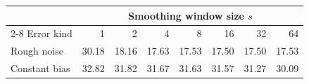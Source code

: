 \begin{tabular}{lrrrrrrr}
\toprule
& \multicolumn{7}{c}{Smoothing window size $s$} \\
\cmidrule{2-8}
Error kind & 1 & 2 & 4 & 8 & 16 & 32 & 64 \\
\midrule
Rough noise & 30.18 & 18.16 & 17.63 & 17.53 & 17.50 & 17.50 & 17.53 \\
Constant bias & 32.82 & 31.82 & 31.67 & 31.63 & 31.57 & 31.27 & 30.09 \\
\bottomrule
\end{tabular}